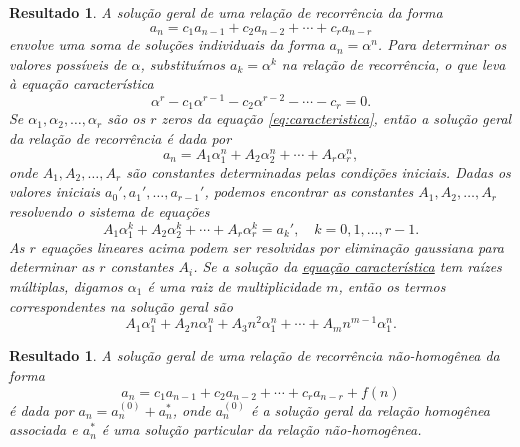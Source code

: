\documentclass[12pt]{article}
\theoremstyle{plain}
\newtheorem{res}[thm]{Resultado}
\theoremstyle{definition}
\theoremstyle{remark}
\begin{document}
\begin{res}
    A solução geral de uma relação de recorrência da forma 
    \begin{equation}
        a_n = c_1 a_{n-1} + c_2 a_{n-2} + \cdots + c_r a_{n-r}
    \end{equation}
    \noindent envolve uma soma de soluções individuais da forma \(a_n=\alpha^n\). Para determinar os valores possíveis de \(\alpha\), substituímos \(a_k=\alpha^k\) na relação de recorrência, o que leva à \emph{equação característica}
    \begin{equation}\label{eq:caracteristica}
        \alpha^r - c_1 \alpha^{r-1} - c_2 \alpha^{r-2} - \cdots - c_r = 0.
    \end{equation}
    Se \(\alpha_1, \alpha_2, \ldots, \alpha_r\) são os \(r\) zeros da equação \eqref{eq:caracteristica}, então a solução geral da relação de recorrência é dada por
    \begin{equation}
        a_n = A_1 \alpha_1^n + A_2 \alpha_2^n + \cdots + A_r \alpha_r^n,
    \end{equation}
    \noindent onde \(A_1, A_2, \ldots, A_r\) são constantes determinadas pelas condições iniciais. Dadas os valores iniciais \(a_0', a_1', \ldots, a_{r-1}'\), podemos encontrar as constantes \(A_1, A_2, \ldots, A_r\) resolvendo o sistema de equações
    \begin{equation}
        A_1\alpha_1^k + A_2\alpha_2^k + \cdots + A_r\alpha_r^k = a_k', \quad k=0,1,\ldots,r-1.
    \end{equation}
    As \(r\) equações lineares acima podem ser resolvidas por eliminação gaussiana para determinar as \(r\) constantes \(A_i\). Se a solução da \href{eq:caracteristica}{equação característica} tem raízes múltiplas, digamos \(\alpha_1\) é uma raiz de multiplicidade \(m\), então os termos correspondentes na solução geral são
    \begin{equation}
        A_1 \alpha_1^n + A_2 n \alpha_1^n + A_3 n^2 \alpha_1^n + \cdots + A_m n^{m-1} \alpha_1^n.
    \end{equation}
\end{res}

\begin{res}
    A solução geral de uma relação de recorrência não-homogênea da forma
    \begin{equation}\label{eq:nao-homogenea}
        a_n = c_1 a_{n-1} + c_2 a_{n-2} + \cdots + c_r a_{n-r} + f(n)
    \end{equation}
    \noindent é dada por \(a_n = a_n^{(0)} + a^{*}_{n}\), onde \(a_n^{(0)}\) é a solução geral da relação homogênea associada e \(a^{*}_{n}\) é uma solução particular da relação não-homogênea.
\end{res}
\end{document}
